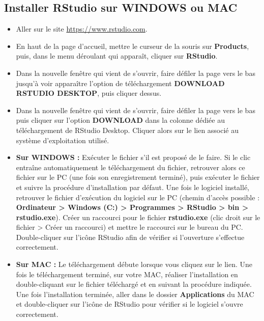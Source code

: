 \documentclass[
  french,
]{book}
\providecommand{\tightlist}{%
  \setlength{\itemsep}{0pt}\setlength{\parskip}{0pt}}
\begin{document}
\hypertarget{installer-rstudio-sur-windows-ou-mac}{%
\subsection{Installer RStudio sur WINDOWS ou MAC}\label{installer-rstudio-sur-windows-ou-mac}}

\begin{itemize}
\tightlist
\item
  Aller sur le site \url{https://www.rstudio.com}.
\item
  En haut de la page d'accueil, mettre le curseur de la souris sur \textbf{Products}, puis, dans le menu déroulant qui apparaît, cliquer sur \textbf{RStudio}.
\item
  Dans la nouvelle fenêtre qui vient de s'ouvrir, faire défiler la page vers le bas jusqu'à voir apparaître l'option de téléchargement \textbf{DOWNLOAD RSTUDIO DESKTOP}, puis cliquer dessus.
\item
  Dans la nouvelle fenêtre qui vient de s'ouvrir, faire défiler la page vers le bas puis cliquer sur l'option \textbf{DOWNLOAD} dans la colonne dédiée au téléchargement de RStudio Desktop. Cliquer alors sur le lien associé au système d'exploitation utilisé.
\item
  \textbf{Sur WINDOWS :} Exécuter le fichier s'il est proposé de le faire. Si le clic entraîne automatiquement le téléchargement du fichier, retrouver alors ce fichier sur le PC (une fois son enregistrement terminé), puis exécuter le fichier et suivre la procédure d'installation par défaut. Une fois le logiciel installé, retrouver le fichier d'exécution du logiciel sur le PC (chemin d'accès possible : \textbf{Ordinateur \textgreater{} Windows (C:) \textgreater{} Programmes \textgreater{} RStudio \textgreater{} bin \textgreater{} rstudio.exe}). Créer un raccourci pour le fichier \textbf{rstudio.exe} (clic droit sur le fichier \textgreater{} Créer un raccourci) et mettre le raccourci sur le bureau du PC. Double-cliquer sur l'icône RStudio afin de vérifier si l'ouverture s'effectue correctement.
\item
  \textbf{Sur MAC :} Le téléchargement débute lorsque vous cliquez sur le lien. Une fois le téléchargement terminé, sur votre MAC, réaliser l'installation en double-cliquant sur le fichier téléchargé et en suivant la procédure indiquée. Une fois l'installation terminée, aller dans le dossier \textbf{Applications} du MAC et double-cliquer sur l'icône de RStudio pour vérifier si le logiciel s'ouvre correctement.
\end{itemize}
\end{document}
